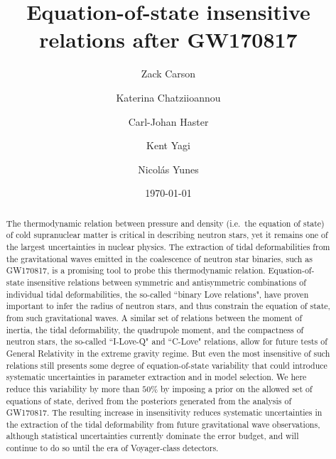 \documentclass[prd,twocolumn,nofootinbib,superscriptaddress,amsmath,amssymb]{revtex4-1}
\begin{document}
\title{Equation-of-state insensitive relations after GW170817}

\author{Zack Carson}
%

\author{Katerina Chatziioannou}
%

\author{Carl-Johan Haster}

\author{Kent Yagi}
%

\author{Nicol\'as Yunes}
%


\date{\today}


\begin{abstract}
The thermodynamic relation between pressure and density (i.e.~the equation of state) of cold supranuclear matter is critical in describing neutron stars, yet it remains one of the largest uncertainties in nuclear physics. 
The extraction of tidal deformabilities from the gravitational waves emitted in the coalescence of neutron star binaries, such as GW170817, is a promising tool to probe this thermodynamic relation.
Equation-of-state insensitive relations between symmetric and antisymmetric combinations of individual tidal deformabilities, the so-called  ``binary Love relations", have proven important to infer the radius of neutron stars, and thus constrain the equation of state, from such gravitational waves. 
A similar set of relations between the moment of inertia, the tidal deformability, the quadrupole moment, and the compactness of neutron stars, the so-called ``I-Love-Q" and ``C-Love" relations, allow for future tests of General Relativity in the extreme gravity regime. 
But even the most insensitive of such relations still presents some degree of equation-of-state variability that could introduce systematic uncertainties in parameter extraction and in model selection. 
%
We here reduce this variability by more than $50\%$ by imposing a prior on the allowed set of equations of state, derived from the posteriors generated from the analysis of GW170817.  
%
The resulting increase in insensitivity reduces systematic uncertainties in the extraction of the tidal deformability from future gravitational wave observations, although statistical uncertainties currently dominate the error budget, and will continue to do so until the era of Voyager-class detectors.  
\end{abstract}
\end{document}
